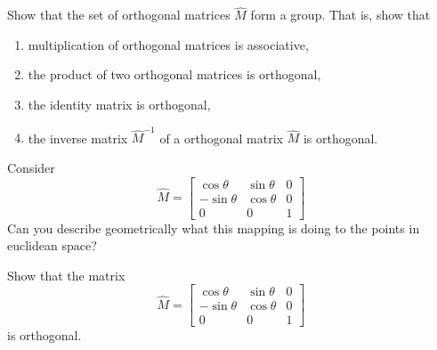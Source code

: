 \documentclass{ximera}
\begin{document}
\begin{problem}
\begin{image}
\end{image}

\end{problem}






\begin{problem}
Show that the set of orthogonal matrices $\hat{M}$ form a group.  That
is, show that
\begin{enumerate}
\item multiplication of orthogonal matrices is associative, 
\item the product of two orthogonal matrices is orthogonal,
\item the identity matrix is orthogonal,
\item the inverse matrix $\hat{M}^{-1}$ of a orthogonal matrix $\hat{M}$ is orthogonal.
\end{enumerate}
\end{problem}




\begin{problem}
  Consider
  \[
  \hat{M}=\begin{bmatrix}
  \cos\theta & \sin\theta & 0\\
  -\sin\theta & \cos\theta & 0\\
  0 & 0 & 1
  \end{bmatrix}
  \]
  Can you describe geometrically what this mapping is doing
  to the points in euclidean space?
\end{problem}


\begin{problem}
\label{14} Show that the matrix%
\[
\hat{M}=\begin{bmatrix}
\cos\theta & \sin\theta & 0\\
-\sin\theta & \cos\theta & 0\\
0 & 0 & 1
\end{bmatrix}
\]
is orthogonal. 
\end{problem}
\end{document}

